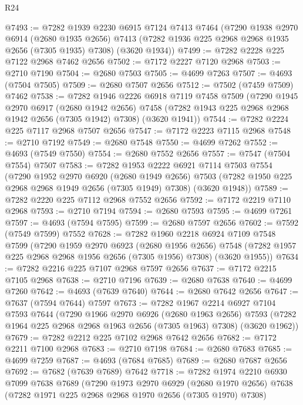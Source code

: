 \begin{lexlean}{R24}
\begin{coremodule}
@7493 := @7282
    @1939
    @2230
    @6915
    @7124
    @7413
    @7464
    (@7290
      @1938
      @2970
      @6914
      (@2680 @1935 @2656)
      @7413
      (@7282 @1936 @225 @2968 @2968 @1935 @2656 (@7305 @1935) @7308)
      (@3620 @1934))
@7499 := @7282 @2228 @225 @7122 @2968 @7462 @2656
@7502 := @7172 @2227 @7120 @2968
@7503 := @2710 @7190
@7504 := @2680 @7503
@7505 := @4699 @7263
@7507 := @4693 (@7504 @7505)
@7509 := @2680 @7507 @2656
@7512 := @7502 (@7459 @7509) @7462
@7538 := @7282
    @1946
    @2226
    @6918
    @7119
    @7458
    @7509
    (@7290
      @1945
      @2970
      @6917
      (@2680 @1942 @2656)
      @7458
      (@7282 @1943 @225 @2968 @2968 @1942 @2656 (@7305 @1942) @7308)
      (@3620 @1941))
@7544 := @7282 @2224 @225 @7117 @2968 @7507 @2656
@7547 := @7172 @2223 @7115 @2968
@7548 := @2710 @7192
@7549 := @2680 @7548
@7550 := @4699 @7262
@7552 := @4693 (@7549 @7550)
@7554 := @2680 @7552 @2656
@7557 := @7547 (@7504 @7554) @7507
@7583 := @7282
    @1953
    @2222
    @6921
    @7114
    @7503
    @7554
    (@7290
      @1952
      @2970
      @6920
      (@2680 @1949 @2656)
      @7503
      (@7282 @1950 @225 @2968 @2968 @1949 @2656 (@7305 @1949) @7308)
      (@3620 @1948))
@7589 := @7282 @2220 @225 @7112 @2968 @7552 @2656
@7592 := @7172 @2219 @7110 @2968
@7593 := @2710 @7194
@7594 := @2680 @7593
@7595 := @4699 @7261
@7597 := @4693 (@7594 @7595)
@7599 := @2680 @7597 @2656
@7602 := @7592 (@7549 @7599) @7552
@7628 := @7282
    @1960
    @2218
    @6924
    @7109
    @7548
    @7599
    (@7290
      @1959
      @2970
      @6923
      (@2680 @1956 @2656)
      @7548
      (@7282 @1957 @225 @2968 @2968 @1956 @2656 (@7305 @1956) @7308)
      (@3620 @1955))
@7634 := @7282 @2216 @225 @7107 @2968 @7597 @2656
@7637 := @7172 @2215 @7105 @2968
@7638 := @2710 @7196
@7639 := @2680 @7638
@7640 := @4699 @7260
@7642 := @4693 (@7639 @7640)
@7644 := @2680 @7642 @2656
@7647 := @7637 (@7594 @7644) @7597
@7673 := @7282
    @1967
    @2214
    @6927
    @7104
    @7593
    @7644
    (@7290
      @1966
      @2970
      @6926
      (@2680 @1963 @2656)
      @7593
      (@7282 @1964 @225 @2968 @2968 @1963 @2656 (@7305 @1963) @7308)
      (@3620 @1962))
@7679 := @7282 @2212 @225 @7102 @2968 @7642 @2656
@7682 := @7172 @2211 @7100 @2968
@7683 := @2710 @7198
@7684 := @2680 @7683
@7685 := @4699 @7259
@7687 := @4693 (@7684 @7685)
@7689 := @2680 @7687 @2656
@7692 := @7682 (@7639 @7689) @7642
@7718 := @7282
    @1974
    @2210
    @6930
    @7099
    @7638
    @7689
    (@7290
      @1973
      @2970
      @6929
      (@2680 @1970 @2656)
      @7638
      (@7282 @1971 @225 @2968 @2968 @1970 @2656 (@7305 @1970) @7308)

\end{coremodule}
\end{lexlean}
